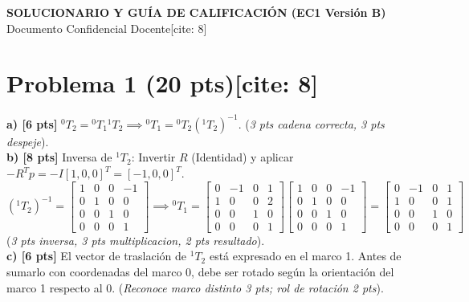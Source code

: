 \documentclass[11pt, a4paper]{article}
\begin{document}
\begin{center}
    \Large\textbf{\textcolor{red!80!black}{SOLUCIONARIO Y GUÍA DE CALIFICACIÓN (EC1 Versión B)}}\\[0.2cm]
    \normalsize Documento Confidencial Docente[cite: 8]
\end{center}

\section*{Problema 1 (20 pts)[cite: 8]}
\textbf{a) [6 pts]} ${}^{0}T_2 = {}^{0}T_1 {}^{1}T_2 \implies {}^{0}T_1 = {}^{0}T_2 ({}^{1}T_2)^{-1}$. (\textit{3 pts cadena correcta, 3 pts despeje}). \\
\textbf{b) [8 pts]} Inversa de ${}^{1}T_2$: Invertir $R$ (Identidad) y aplicar $-R^T p = -I[1,0,0]^T = [-1,0,0]^T$.
\begin{equation*}
    ({}^{1}T_2)^{-1} = \begin{bmatrix} 1&0&0&-1 \\ 0&1&0&0 \\ 0&0&1&0 \\ 0&0&0&1 \end{bmatrix} \implies
    {}^{0}T_1 = \begin{bmatrix} 0&-1&0&1 \\ 1&0&0&2 \\ 0&0&1&0 \\ 0&0&0&1 \end{bmatrix} \begin{bmatrix} 1&0&0&-1 \\ 0&1&0&0 \\ 0&0&1&0 \\ 0&0&0&1 \end{bmatrix} = \begin{bmatrix} 0&-1&0&1 \\ 1&0&0&1 \\ 0&0&1&0 \\ 0&0&0&1 \end{bmatrix}
\end{equation*}
(\textit{3 pts inversa, 3 pts multiplicacion, 2 pts resultado}).\\
\textbf{c) [6 pts]} El vector de traslación de ${}^{1}T_2$ está expresado en el marco 1. Antes de sumarlo con coordenadas del marco 0, debe ser rotado según la orientación del marco 1 respecto al 0. (\textit{Reconoce marco distinto 3 pts; rol de rotación 2 pts}).
\end{document}
